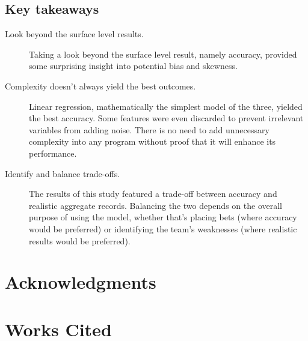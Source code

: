 \documentclass{paper}
\begin{document}
\subsection{Key takeaways}
\begin{description}
\item[Look beyond the surface level results.] Taking a look beyond the surface level result, namely accuracy, provided some surprising insight into potential bias and skewness.
\item[Complexity doesn't always yield the best outcomes.] Linear regression, mathematically the simplest model of the three, yielded the best accuracy. Some features were even discarded to prevent irrelevant variables from adding noise. There is no need to add unnecessary complexity into any program without proof that it will enhance its performance.
\item[Identify and balance trade-offs.] The results of this study featured a trade-off between accuracy and realistic aggregate records. Balancing the two depends on the overall purpose of using the model, whether that's placing bets (where accuracy would be preferred) or identifying the team's weaknesses (where realistic results would be preferred).
\end{description}

\section{Acknowledgments}

\section{Works Cited}
\end{document}
